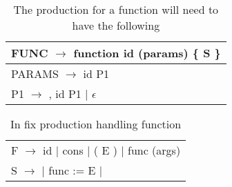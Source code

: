 \documentclass[11pt]{article}
\begin{document}
 
 \begin{table}[htdp]
\caption{The production for a function will need to have the following}
\begin{center}
\begin{tabular}{l}
FUNC $\to$ function id (params) \{ S \} \\
\hline
PARAMS  $\to$  id P1 \\
 P1 $\to$ , id P1  | $\epsilon$ \\
\end{tabular}
\end{center}
\label{default}
\end{table}%


 \begin{table}[htdp]
\caption{In fix production handling function}
\begin{center}
\begin{tabular}{l}
F $\to$ id $|$ cons $|$ ( E )  $|$ func (args)  \\
S $\to $ $|$ func := E $|$   
\end{tabular}
\end{center}
\label{default}
\end{table}%
\end{document}
